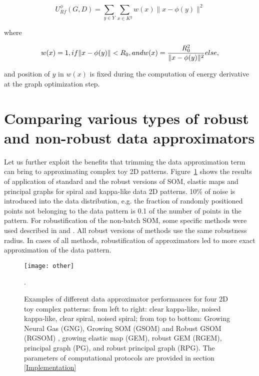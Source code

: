 \documentclass[graybox]{archivesofdatascience}
\begin{document}
\begin{equation}\label{robustApproximationTermWithDistantPoints}
U^{\phi}_{Rf}(G,D) = \sum_{y \in Y} \sum_{x \in K^y} w(x) \|x-\phi(y)\|^2
\end{equation}

\noindent where

\begin{equation}
w(x) = 1, \space if \space \|x-\phi(y)\|<R_0, \space and \space w(x)=\frac{R_0^2}{\|x-\phi(y)\|^2} \space else,
\end{equation}

\noindent and position of $y$ in $w(x)$ is fixed during the computation of energy derivative at the graph optimization step.
\fi

\section{Comparing various types of robust and non-robust data approximators}\label{Result}

Let us further exploit the benefits that trimming the data approximation term can bring to approximating complex toy 2D patterns. Figure~\ref{GORBANROTHER} shows the results of application of standard and the robust versions of SOM, elastic maps and principal graphs for spiral and kappa-like data 2D patterns. 10\% of noise is introduced into the data distribution, e.g. the fraction of randomly positioned points not belonging to the data pattern is 0.1 of the number of points in the pattern. For robustification of the non-batch SOM, some specific methods were used described in \citet{allende2004robust} and \citet{kohonen2001self}. All robust versions of methods use the same robustness radius. In cases of all methods, robustification of approximators led to more exact approximation of the data pattern.

\begin{figure}[tbp]
\texttt{[image: other]}
\caption{Examples of different data approximator performances for four 2D toy complex patterns: from left to right: clear kappa-like, noised kappa-like, clear spiral, noised spiral; from top to bottom: Growing Neural Gas (GNG)\citep{martinetz1993neural}, Growing SOM (GSOM) and Robust GSOM (RGSOM) \citep{Alahakoon2000}, growing elastic map (GEM), robust GEM (RGEM), principal graph (PG)\citep{gorban2007topological,GorbanHand}, and robust principal graph (RPG). The parameters of computational protocols are provided in section \ref{Implementation}}.
\label{GORBANROTHER}       \end{figure}
\end{document}

